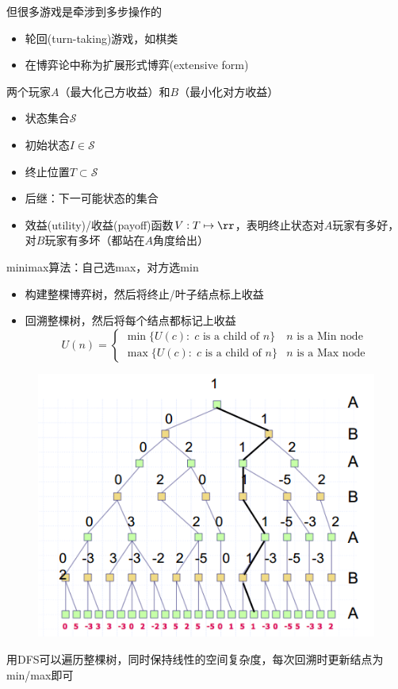 但很多游戏是牵涉到多步操作的
\begin{itemize}
	\item 轮回(turn-taking)游戏，如棋类
	\item 在博弈论中称为扩展形式博弈(extensive form)
\end{itemize}

两个玩家$A$（最大化己方收益）和$B$（最小化对方收益）
\begin{itemize}
	\item 状态集合$\mathcal{S}$
	\item 初始状态$I\in\mathcal{S}$
	\item 终止位置$T\subset\mathcal{S}$
	\item 后继：下一可能状态的集合
	\item 效益(utility)/收益(payoff)函数$V:T\mapsto\rr$，表明终止状态对$A$玩家有多好，对$B$玩家有多坏（都站在$A$角度给出）
\end{itemize}

minimax算法：自己选max，对方选min
\begin{itemize}
	\item 构建整棵博弈树，然后将终止/叶子结点标上收益
	\item 回溯整棵树，然后将每个结点都标记上收益
\[U(n)=
\begin{cases}
\min\{U(c):\;c \text{ is a child of } n\} & n \text{ is a Min node}\\
\max\{U(c):\;c \text{ is a child of } n\} & n \text{ is a Max node}
\end{cases}\]
\end{itemize}
\begin{figure}[H]
\centering
\includegraphics[width=0.6\linewidth]{fig/game-tree.png}
\end{figure}

用DFS可以遍历整棵树，同时保持线性的空间复杂度，每次回溯时更新结点为min/max即可

